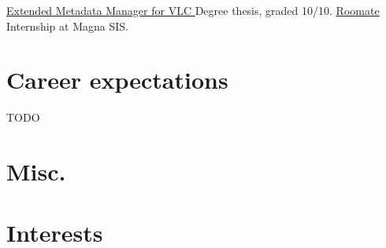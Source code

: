 \documentclass[letterpaper]{twentysecondcv} %
\begin{document}
\begin{twenty} %
    	{\href{https://github.com/ASantosVal/EMM_for_VLC}
    	{Extended Metadata Manager for VLC \faExternalLink} }
    	{}
    	{Degree thesis, graded 10/10.}
    	{\href{https://roomate-magnarenove.herokuapp.com/}
    	{Roomate \faExternalLink} }
    	{}
    	{Internship at Magna SIS.}
\end{twenty}


\section{Career expectations}
TODO


\section{Misc.}

\begin{customList} %
\end{customList}


\section{Interests}

\begin{customList} %
\end{customList}
\end{document}
